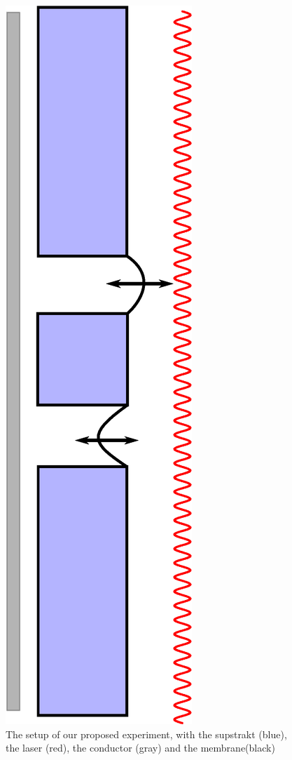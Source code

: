 \begin{figure}
  \centering
  \includegraphics[width=0.3\columnwidth]{Figures/Fuck_dig_christoffer.eps}
  \caption{The setup of our proposed experiment, with the supstrakt (blue), the laser (red), the conductor (gray) and the membrane(black)}
  \label{FDC}
\end{figure}